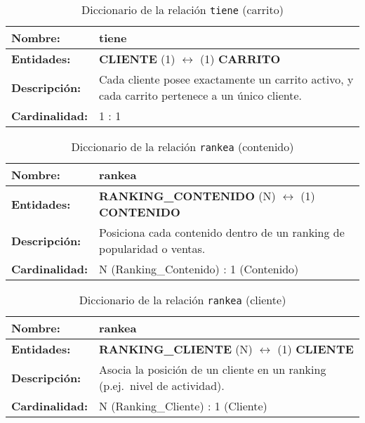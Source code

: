 \newpage
\begin{longtable}{|p{3.5cm}|p{10cm}|}
\caption{Diccionario de la relación \texttt{tiene} (carrito)}
\label{tab:rel_tiene_carrito} \\ \hline
\textbf{Nombre:} & tiene \\ \hline
\textbf{Entidades:} & \textbf{CLIENTE} (1) $\longleftrightarrow$ (1) \textbf{CARRITO} \\ \hline
\textbf{Descripción:} & Cada cliente posee exactamente un carrito activo, y cada carrito pertenece a un único cliente. \\ \hline
\textbf{Cardinalidad:} & 1 : 1 \\ \hline
\end{longtable}

\begin{longtable}{|p{3.5cm}|p{10cm}|}
\caption{Diccionario de la relación \texttt{rankea} (contenido)}
\label{tab:rel_rankea_contenido} \\ \hline
\textbf{Nombre:} & rankea \\ \hline
\textbf{Entidades:} & \textbf{RANKING\_CONTENIDO} (N) $\longleftrightarrow$ (1) \textbf{CONTENIDO} \\ \hline
\textbf{Descripción:} & Posiciona cada contenido dentro de un ranking de popularidad o ventas. \\ \hline
\textbf{Cardinalidad:} & N (Ranking\_Contenido) : 1 (Contenido) \\ \hline
\end{longtable}

\begin{longtable}{|p{3.5cm}|p{10cm}|}
\caption{Diccionario de la relación \texttt{rankea} (cliente)}
\label{tab:rel_rankea_cliente} \\ \hline
\textbf{Nombre:} & rankea \\ \hline
\textbf{Entidades:} & \textbf{RANKING\_CLIENTE} (N) $\longleftrightarrow$ (1) \textbf{CLIENTE} \\ \hline
\textbf{Descripción:} & Asocia la posición de un cliente en un ranking (p.ej.\ nivel de actividad). \\ \hline
\textbf{Cardinalidad:} & N (Ranking\_Cliente) : 1 (Cliente) \\ \hline
\end{longtable}